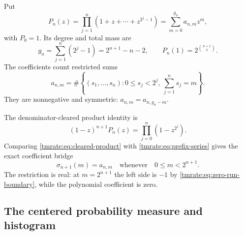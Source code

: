 \documentclass[11pt,oneside]{article}
\theoremstyle{definition}
\theoremstyle{remark}
\begin{document}
Put
\begin{equation}
 P_n(z)=\prod_{j=1}^{n}(1+z+\cdots+z^{2^j-1})
       =\sum_{m=0}^{g_n}a_{n,m}z^m,                        \label{tmrate:eq:Pn}
\end{equation}
with $P_0=1$.  Its degree and total mass are
\begin{equation}
 g_n=\sum_{j=1}^{n}(2^j-1)=2^{n+1}-n-2,
 \qquad
 P_n(1)=2^{\binom{n+1}{2}}.                                \label{tmrate:eq:degree-mass}
\end{equation}
The coefficients count restricted sums
\begin{equation}
 a_{n,m}=
 \#\left\{(s_1,\ldots,s_n):
 0\le s_j<2^j,\ \sum_{j=1}^{n}s_j=m\right\}.              \label{tmrate:eq:coefficient-count}
\end{equation}
They are nonnegative and symmetric: $a_{n,m}=a_{n,g_n-m}$.

The denominator-cleared product identity is
\begin{equation}
 (1-z)^{n+1}P_n(z)=\prod_{j=0}^{n}(1-z^{2^j}).              \label{tmrate:eq:cleared-product}
\end{equation}
Comparing \eqref{tmrate:eq:cleared-product} with
\eqref{tmrate:eq:prefix-series} gives the exact coefficient bridge
\begin{equation}
 \boxed{\displaystyle
 \sigma_{n+1}(m)=a_{n,m}
 \quad\text{whenever}\quad 0\le m<2^{n+1}.}               \label{tmrate:eq:prefix-coefficient}
\end{equation}
The restriction is real: at $m=2^{n+1}$ the left side is $-1$ by
\eqref{tmrate:eq:zero-run-boundary}, while the polynomial coefficient is zero.

\subsection{The centered probability measure and histogram}
\end{document}

